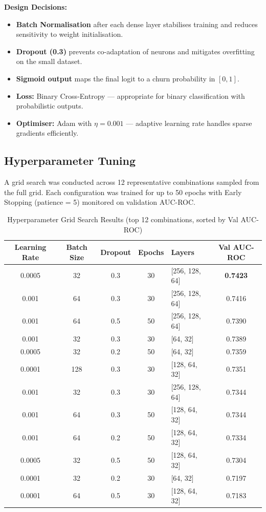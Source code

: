 \documentclass[12pt, a4paper]{article}
\begin{document}
\textbf{Design Decisions:}
\begin{itemize}[noitemsep]
  \item \textbf{Batch Normalisation} after each dense layer stabilises training and reduces sensitivity to weight initialisation.
  \item \textbf{Dropout (0.3)} prevents co-adaptation of neurons and mitigates overfitting on the small dataset.
  \item \textbf{Sigmoid output} maps the final logit to a churn probability in $[0, 1]$.
  \item \textbf{Loss:} Binary Cross-Entropy — appropriate for binary classification with probabilistic outputs.
  \item \textbf{Optimiser:} Adam with $\eta = 0.001$ — adaptive learning rate handles sparse gradients efficiently.
\end{itemize}

\subsection{Hyperparameter Tuning}
\label{sec:hp}

A grid search was conducted across 12 representative combinations sampled from the full grid. Each configuration was trained for up to 50 epochs with Early Stopping (patience = 5) monitored on validation AUC-ROC.

\begin{table}[H]
\centering
\caption{Hyperparameter Grid Search Results (top 12 combinations, sorted by Val AUC-ROC)}
\label{tab:hp}
\begin{tabular}{cccclc}
\toprule
\textbf{Learning Rate} & \textbf{Batch Size} & \textbf{Dropout} & \textbf{Epochs} & \textbf{Layers} & \textbf{Val AUC-ROC} \\
\midrule
0.0005 & 32  & 0.3 & 30 & [256, 128, 64] & \textbf{0.7423} \\
0.001  & 64  & 0.3 & 30 & [256, 128, 64] & 0.7416 \\
0.001  & 64  & 0.5 & 50 & [256, 128, 64] & 0.7390 \\
0.001  & 32  & 0.3 & 30 & [64, 32]       & 0.7389 \\
0.0005 & 32  & 0.2 & 50 & [64, 32]       & 0.7359 \\
0.0001 & 128 & 0.3 & 30 & [128, 64, 32]  & 0.7351 \\
0.001  & 32  & 0.3 & 30 & [256, 128, 64] & 0.7344 \\
0.001  & 64  & 0.3 & 50 & [128, 64, 32]  & 0.7344 \\
0.001  & 64  & 0.2 & 50 & [128, 64, 32]  & 0.7334 \\
0.0005 & 32  & 0.5 & 50 & [128, 64, 32]  & 0.7304 \\
0.0001 & 32  & 0.2 & 30 & [64, 32]       & 0.7197 \\
0.0001 & 64  & 0.5 & 30 & [128, 64, 32]  & 0.7183 \\
\bottomrule
\end{tabular}
\end{table}
\end{document}
